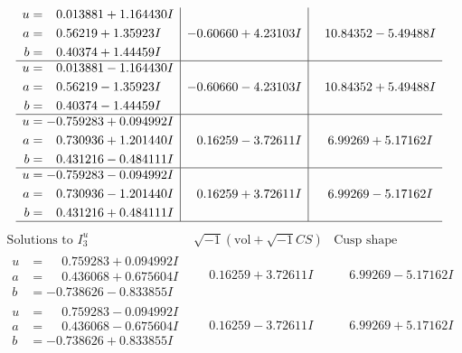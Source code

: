 \documentclass[1p]{elsarticle_modified}
\theoremstyle{definition}
\newcommand{\I}{\sqrt{-1}}
\begin{document}
$$\begin{array}{c|c|c}
\begin{aligned}
u &= \phantom{-}0.013881 + 1.164430 I \\
a &= \phantom{-}0.56219 + 1.35923 I \\
b &= \phantom{-}0.40374 + 1.44459 I\end{aligned}
 & -0.60660 + 4.23103 I & \phantom{-}10.84352 - 5.49488 I \\ \hline\begin{aligned}
u &= \phantom{-}0.013881 - 1.164430 I \\
a &= \phantom{-}0.56219 - 1.35923 I \\
b &= \phantom{-}0.40374 - 1.44459 I\end{aligned}
 & -0.60660 - 4.23103 I & \phantom{-}10.84352 + 5.49488 I \\ \hline\begin{aligned}
u &= -0.759283 + 0.094992 I \\
a &= \phantom{-}0.730936 + 1.201440 I \\
b &= \phantom{-}0.431216 - 0.484111 I\end{aligned}
 & \phantom{-}0.16259 - 3.72611 I & \phantom{-}6.99269 + 5.17162 I \\ \hline\begin{aligned}
u &= -0.759283 - 0.094992 I \\
a &= \phantom{-}0.730936 - 1.201440 I \\
b &= \phantom{-}0.431216 + 0.484111 I\end{aligned}
 & \phantom{-}0.16259 + 3.72611 I & \phantom{-}6.99269 - 5.17162 I\\
 \hline 
 \end{array}$$\newpage$$\begin{array}{c|c|c}  
\text{Solutions to }I^u_{3}& \I (\text{vol} + \sqrt{-1}CS) & \text{Cusp shape}\\
 \hline 
\begin{aligned}
u &= \phantom{-}0.759283 + 0.094992 I \\
a &= \phantom{-}0.436068 + 0.675604 I \\
b &= -0.738626 - 0.833855 I\end{aligned}
 & \phantom{-}0.16259 + 3.72611 I & \phantom{-}6.99269 - 5.17162 I \\ \hline\begin{aligned}
u &= \phantom{-}0.759283 - 0.094992 I \\
a &= \phantom{-}0.436068 - 0.675604 I \\
b &= -0.738626 + 0.833855 I\end{aligned}
 & \phantom{-}0.16259 - 3.72611 I & \phantom{-}6.99269 + 5.17162 I \\ \hline\begin{aligned}

\end{aligned}
\end{array}$$
\end{document}
